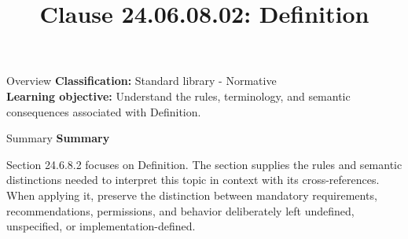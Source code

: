 \documentclass[10pt,letterpaper]{article}
\title{Clause 24.06.08.02: Definition}
\author{}
\date{}
\begin{document}
\maketitle
\begin{CornellOverviewBox}{Overview}
\textbf{Classification:} Standard library - Normative\\[2pt]
\textbf{Learning objective:} Understand the rules, terminology, and semantic consequences associated with Definition.
\end{CornellOverviewBox}\begin{CornellSummaryBox}{Summary}
{\sffamily\bfseries\color{Accent} Summary}\par\vspace{3pt}Section 24.6.8.2 focuses on Definition. The section supplies the rules and semantic distinctions needed to interpret this topic in context with its cross-references. When applying it, preserve the distinction between mandatory requirements, recommendations, permissions, and behavior deliberately left undefined, unspecified, or implementation-defined.
\end{CornellSummaryBox}
\end{document}
